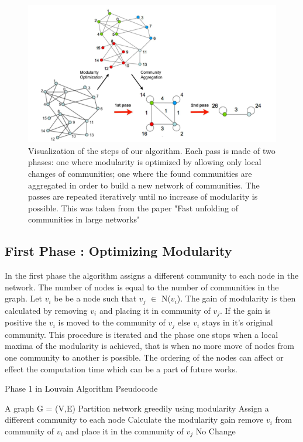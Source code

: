  \begin{figure}[h]

\includegraphics[scale=0.5]{loustep.png}
\caption{\label{loupic} Visualization of the steps of our algorithm. Each pass is made of two phases:
one where modularity is optimized by allowing only local changes of communities;
one where the found communities are aggregated in order to build a new network of
communities. The passes are repeated iteratively until no increase of modularity is
possible. This was taken from the paper "Fast unfolding of communities in large networks" \cite{Louvain}}
\centering
\end{figure}

\subsection{First Phase : Optimizing Modularity}
In the first phase the algorithm assigns a different community to each node in the network.  The number of nodes is equal to the number of communities in the graph. Let $v_i$ be be a node such that $v_j$ $\in$ N($v_i$). The gain of modularity is then calculated by removing $v_i$ and placing it in community of $v_j$. If the gain is positive the $v_i$ is moved to the community of $v_j$ else $v_i$ stays in it's original community. This procedure is iterated and the phase one stops when a local maxima of the modularity is achieved, that is when no more move of nodes from one community to another is possible. The ordering of the nodes can affect or effect the computation time which can be a part of future works. 

\begin{algorithm}[H]
\caption{Phase 1 in Louvain Algorithm Pseudocode}
\begin{algorithmic} 
\REQUIRE A graph G = (V,E)
\ENSURE Partition network greedily using modularity
\STATE Assign a different community to each node
\STATE Calculate the modularity gain
\STATE remove $v_i$ from community of $v_i$ and place it in the community of $v_j$
\ELSE 
\STATE No Change
\ENDIF
\ENDFOR
\ENDWHILE
\end{algorithmic}
\end{algorithm}

